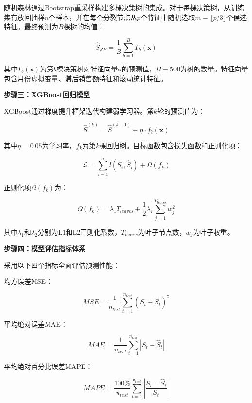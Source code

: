 随机森林通过Bootstrap重采样构建多棵决策树的集成。对于每棵决策树，从训练集有放回抽样$n$个样本，并在每个分裂节点从$p$个特征中随机选取$m=\lfloor p/3 \rfloor$个候选特征。最终预测为$B$棵树的均值：

\begin{equation}
\hat{S}_{RF} = \frac{1}{B} \sum_{b=1}^{B} T_b(\mathbf{x})
\end{equation}

其中$T_b(\mathbf{x})$为第$b$棵决策树对特征向量$\mathbf{x}$的预测值，$B=500$为树的数量。特征向量包含月份虚拟变量、滞后销售额特征和滚动统计特征。

\textbf{步骤三：XGBoost回归模型}

XGBoost通过梯度提升框架迭代构建弱学习器。第$k$轮的预测值为：

\begin{equation}
\hat{S}^{(k)} = \hat{S}^{(k-1)} + \eta \cdot f_k(\mathbf{x})
\end{equation}

其中$\eta=0.05$为学习率，$f_k$为第$k$棵回归树。目标函数包含损失函数和正则化项：

\begin{equation}
\mathcal{L} = \sum_{i=1}^{n} l(S_i, \hat{S}_i) + \Omega(f_k)
\end{equation}

正则化项$\Omega(f_k)$为：

\begin{equation}
\Omega(f_k) = \lambda_1 T_{leaves} + \frac{1}{2}\lambda_2 \sum_{j=1}^{T_{leaves}} w_j^2
\end{equation}

其中$\lambda_1$和$\lambda_2$分别为L1和L2正则化系数，$T_{leaves}$为叶子节点数，$w_j$为叶子权重。

\textbf{步骤四：模型评估指标体系}

采用以下四个指标全面评估预测性能：

均方误差MSE：

\begin{equation}
MSE = \frac{1}{n_{test}} \sum_{t=1}^{n_{test}} (S_t - \hat{S}_t)^2
\end{equation}

平均绝对误差MAE：

\begin{equation}
MAE = \frac{1}{n_{test}} \sum_{t=1}^{n_{test}} |S_t - \hat{S}_t|
\end{equation}

平均绝对百分比误差MAPE：

\begin{equation}
MAPE = \frac{100\%}{n_{test}} \sum_{t=1}^{n_{test}} \left|\frac{S_t - \hat{S}_t}{S_t}\right|
\end{equation}


